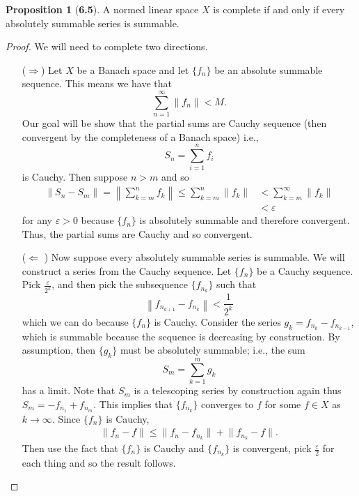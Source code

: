 \documentclass[12pt]{article}
\renewcommand{\epsilon}{\varepsilon}
\theoremstyle{definition}
\newtheorem*{prop}{Proposition}
\begin{document}
\begin{prop}[\textbf{6.5}]

    A normed linear space \( X \) is complete if and only if every absolutely summable series is summable.

    \begin{proof}
        We will need to complete two directions.
            \begin{enumerate}
                \item[(\(\Rightarrow\))] Let \( X \) be a Banach space and let \( \{f_n \} \) be an absolute summable sequence. This means we have that
                    \[
                        \sum_{n=1}^{\infty} \lVert f_n \rVert < M.
                    \]
                Our goal will be show that the partial sums are Cauchy sequence (then convergent by the completeness of a Banach space) i.e.,
                    \[
                        S_n =  \sum_{i=1}^{n}f_i  
                    \]
                is Cauchy. Then suppose \( n > m \) and so
                    \begin{align*}
                        \lVert S_n - S_m \rVert = \left\lVert \sum_{k=m}^{n} f_k \right\rVert \leq \sum_{k=m}^{n} \lVert f_k \rVert &< \sum_{k=m}^{\infty} \lVert f_k \rVert  \\
                        &< \epsilon
                    \end{align*}
                for any \( \epsilon > 0 \) because \( \{f_n\} \) is absolutely summable and therefore convergent. Thus, the partial sums are Cauchy and so convergent.
                \item[(\( \Leftarrow\) )] Now suppose every absolutely summable series is summable. We will construct a series from the Cauchy sequence. Let \( \{ f_n\} \) be a Cauchy sequence. Pick \( \displaystyle \frac{\epsilon}{2^{k}} \), and then pick the subsequence \( \{f_{n_{k}} \} \) such that 
                    \[
                        \left\lVert f_{n_{k+1}} - f_{n_{k}} \right\rVert < \frac{1}{2^{k}} 
                    \]
                which we can do because \( \{f_n\}\) is Cauchy.
                Consider the series \( g_k = f_{n_{k}} - f_{n_{k-1}} \), which is summable because the sequence is decreasing by construction. By assumption, then \( \{g_k\}\) must be absolutely summable; i.e., the sum
                    \[
                        S_m = \sum_{k=1}^{m} g_k  
                    \]
                has a limit. Note that \( S_m \) is a telescoping series by construction again thus \( S_m = -f_{n_{1}} + f_{n_{m}} \). This implies that \( \{f_{n_{k}} \} \) converges to \( f \) for some \( f \in X \) as \( k \to \infty \). Since \( \{f_n\} \) is Cauchy,
                    \begin{align*}
                        \left\lVert f_n - f \right\rVert \leq \lVert f_n - f_{n_{k}} \rVert + \lVert f_{n_{k}} - f \rVert.
                    \end{align*}
                Then use the fact that \( \{f_n\} \) is Cauchy and \( \{f_{n_{k}}\}\) is convergent, pick \( \displaystyle \frac{\epsilon}{2} \) for each thing and so the result follows.
                

\end{enumerate}
\end{proof}
\end{prop}
\end{document}

